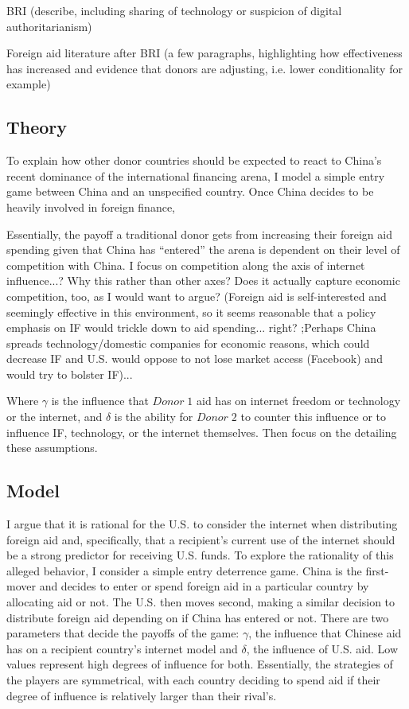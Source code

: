 BRI (describe, including sharing of technology or suspicion of digital authoritarianism)

Foreign aid literature after BRI (a few paragraphs, highlighting how effectiveness has increased and evidence that donors are adjusting, i.e. lower conditionality for example)

\subsection*{Theory}
To explain how other donor countries should be expected to react to China's recent dominance of the international financing arena, I model a simple entry game between China and an unspecified country. Once China decides to be heavily involved in foreign finance, 

Essentially, the payoff a traditional donor gets from increasing their foreign aid spending given that China has ``entered'' the arena is dependent on their level of competition with China. I focus on competition along the axis of internet influence...? Why this rather than other axes? Does it actually capture economic competition, too, as I would want to argue? (Foreign aid is self-interested and seemingly effective in this environment, so it seems reasonable that a policy emphasis on IF would trickle down to aid spending... right? ;Perhaps China spreads technology/domestic companies for economic reasons, which could decrease IF and U.S. would oppose to not lose market access (Facebook) and would try to bolster IF)...

Where $\gamma$ is the influence that $Donor\;1$ aid has on internet freedom or technology or the internet, and $\delta$ is the ability for $Donor\;2$ to counter this influence or to influence IF, technology, or the internet themselves. Then focus on the detailing these assumptions.

\subsection*{Model}
I argue that it is rational for the U.S. to consider the internet when distributing foreign aid and, specifically, that a recipient's current use of the internet should be a strong predictor for receiving U.S. funds. To explore the rationality of this alleged behavior, I consider a simple entry deterrence game. China is the first-mover and decides to enter or spend foreign aid in a particular country by allocating aid or not. The U.S. then moves second, making a similar decision to distribute foreign aid depending on if China has entered or not. There are two parameters that decide the payoffs of the game: $\gamma$, the influence that Chinese aid has on a recipient country's internet model and $\delta$, the influence of U.S. aid. Low values represent high degrees of influence for both. Essentially, the strategies of the players are symmetrical, with each country deciding to spend aid if their degree of influence is relatively larger than their rival's.

